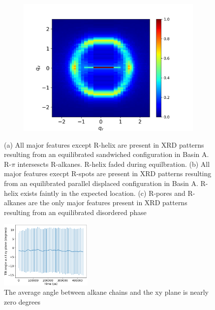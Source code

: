 \documentclass{article}
\begin{document}
\begin{figure}[!ht]
\begin{subfigure}{0.31\textwidth}
		\caption{}\label{fig:offsetrzplot}
	\end{subfigure}
	\begin{subfigure}{0.31\textwidth}
		\centering
		\hspace{-0.9cm}
		\includegraphics[width=\textwidth]{disorder_rzplot.png}
		\caption{}\label{fig:disorder_rzplot.png}
	\end{subfigure}
	\caption{(a) All major features except R-helix are present in
	XRD patterns resulting from an equilibrated sandwiched configuration 
	in Basin A. R-$\pi$ intersescts R-alkanes. R-helix faded during equilbration.
	(b) All major features execpt R-spots are present in XRD patterns 
	resulting from an equilibrated parallel displaced configuration in Basin A.
	R-helix exists faintly in the expected location. (c) R-pores and R-alkanes
	are the only major features present in XRD patterns resulting from an 
	equilibrated disordered phase}\label{fig:XRDsim}
  \end{figure}

  \begin{figure}
        \centering
        \includegraphics[width=0.4\textwidth]{tilt.png}
        \caption{The average angle between alkane chains and the xy plane is nearly zero degrees}\label{fig:tilt}
  \end{figure}
  
\end{document}
